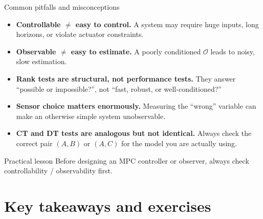 \documentclass[aspectratio=169,10pt]{beamer}
\newcommand{\Ocal}{\mathcal{O}}
\begin{document}
\begin{frame}{Common pitfalls and misconceptions}
\begin{itemize}
  \item \textbf{Controllable $\neq$ easy to control.}
        A system may require huge inputs, long horizons, or violate
        actuator constraints.

  \item \textbf{Observable $\neq$ easy to estimate.}
        A poorly conditioned $\Ocal$ leads to noisy, slow estimation.

  \item \textbf{Rank tests are structural, not performance tests.}
        They answer ``possible or impossible?'', not ``fast, robust, or
        well-conditioned?''

  \item \textbf{Sensor choice matters enormously.}
        Measuring the ``wrong'' variable can make an otherwise simple
        system unobservable.

  \item \textbf{CT and DT tests are analogous but not identical.}
        Always check the correct pair $(A,B)$ or $(A,C)$ for the model
        you are actually using.
\end{itemize}

\begin{alertbox}{Practical lesson}
Before designing an MPC controller or observer, always check
controllability / observability first.
\end{alertbox}
\end{frame}

\section{Key takeaways and exercises}
\end{document}

